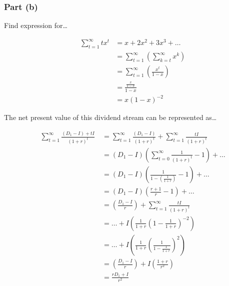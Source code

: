 \documentclass[11pt]{article}
\begin{document}
\subsubsection*{Part (b)}

Find expression for\dots

\setcounter{equation}{0}
\begin{eqnarray}
  & \sum_{t=1}^{\infty} tx^{t} &= x + 2x^{2} + 3x^{3} + \dots \\
                               &&= \sum_{t=1}^{\infty} \left( \sum_{k=t}^{\infty} x^{k} \right) \\
                               &&= \sum_{t=1}^{\infty} \left( \frac{x^{t}}{1 - x} \right) \\
                               &&= \frac{\frac{x}{1 - x}}{1 - x} \\
                               &&= x\left(1 - x\right)^{-2}
\end{eqnarray}

The net present value of this dividend stream can be represented as\dots

\begin{eqnarray}
  & \sum_{t=1}^{\infty} \frac{\left(D_{1} - I\right) + tI}{\left(1 + r\right)^{t}} \
  &= \sum_{t=1}^{\infty} \frac{\left(D_{1} - I\right)}{\left(1+r\right)^{t}} + \sum_{t=1}^{\infty} \frac{tI}{\left(1+r\right)^{t}} \\
  &&= \left(D_{1} - I\right)\left( \sum_{t=0}^{\infty} \frac{1}{\left(1+r\right)^{t}} - 1 \right) + \dots \\
  &&= \left(D_{1} - I\right)\left( \frac{1}{1 - \left(\frac{1}{1+r}\right)} -1 \right) + \dots \\
  &&= \left(D_{1} - I\right)\left( \frac{r+1}{r} -1 \right) + \dots \\
  &&= \left( \frac{D_{1} - I}{r} \right) + \sum_{t=1}^{\infty} \frac{tI}{\left(1+r\right)^{t}} \\
  &&= \dots + I\left( \frac{1}{1+r} \left(1 - \frac{1}{1+r}\right)^{-2} \right) \\
  &&= \dots + I\left( \frac{1}{1+r} \left( \frac{1}{1 - \frac{1}{1+r}} \right)^{2} \right) \\
  &&= \left( \frac{D_{1} - I}{r} \right) + I\left( \frac{1+r}{r^{2}} \right) \\[4mm]
  &&= \frac{rD_{1} + I}{r^{2}}
\end{eqnarray}

\newpage

\end{document}
